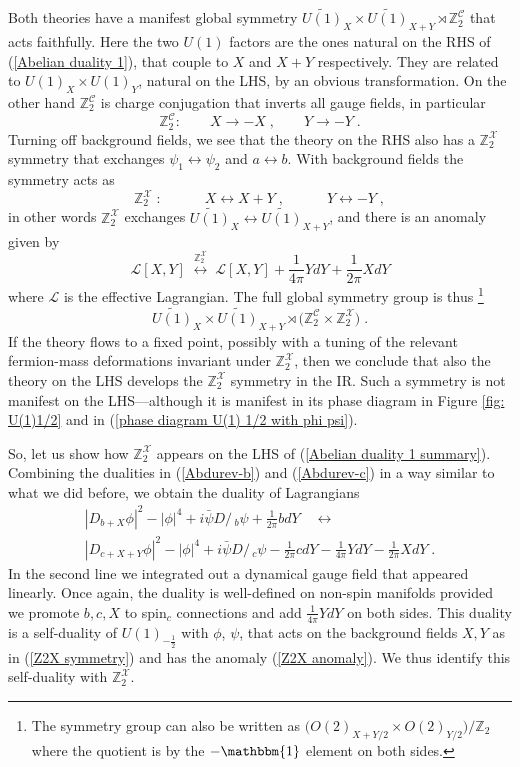 \documentclass[a4paper, 12pt]{article}
\newcommand{\wt}{\widetilde}
\numberwithin{equation}{section}
\newcommand{\Dslash}{D\!\!\!\!\slash\,}
\newcommand{\be}{\begin{equation}} \newcommand{\ee}{\end{equation}}
\newcommand{\cC}{\mathcal{C}}
\newcommand{\cL}{\mathcal{L}}
\newcommand{\cX}{\mathcal{X}}
\newcommand{\bZ}{\mathbb{Z}}
\newcommand{\unit}{\mathbbm{1}}
\begin{document}
Both theories have a manifest global symmetry $\wt{U(1)}_X \times \wt{U(1)}_{X+Y} \rtimes \bZ_2^\cC$ that acts faithfully. Here the two $U(1)$ factors are the ones natural on the RHS of (\ref{Abelian duality 1}), that couple to $X$ and $X+Y$ respectively. They are related to $U(1)_X \times U(1)_Y$, natural on the LHS, by an obvious transformation. On the other hand $\bZ_2^\cC$ is charge conjugation that inverts all gauge fields, in particular
\be
\bZ_2^\cC:\qquad X \to - X \;,\qquad Y \to -Y \;.
\ee
Turning off background fields, we see that the theory on the RHS also has a $\bZ_2^\cX$ symmetry that exchanges $\psi_1 \leftrightarrow\psi_2$ and $a \leftrightarrow b$. With background fields the symmetry acts as
\be
\label{Z2X symmetry}
\bZ_2^\cX\;:\qquad\quad X \leftrightarrow X+Y \;,\qquad\quad Y \leftrightarrow - Y \;,
\ee
in other words $\bZ_2^\cX$ exchanges $\wt{U(1)}_X \leftrightarrow \wt{U(1)}_{X+Y}$, and there is an anomaly given by
\be
\label{Z2X anomaly}
\cL[X,Y] \;\stackrel{\bZ_2^\cX}{\longleftrightarrow}\; \cL[X,Y] + \frac1{4\pi} YdY + \frac1{2\pi} XdY
\ee
where $\cL$ is the effective Lagrangian. The full global symmetry group is thus%
\footnote{The symmetry group can also be written as $\big( O(2)_{X + Y/2} \times O(2)_{Y/2} \big)/\bZ_2$ where the quotient is by the $-\unit$ element on both sides.}
\be
\wt{U(1)}_X \times \wt{U(1)}_{X+Y} \rtimes \big( \bZ_2^\cC \times \bZ_2^\cX \big) \;.
\ee
If the theory flows to a fixed point, possibly with a tuning of the relevant fermion-mass deformations invariant under $\bZ_2^\cX$, then we conclude that also the theory on the LHS develops the $\bZ_2^\cX$ symmetry in the IR. Such a symmetry is not manifest on the LHS---although it is manifest in its phase diagram in Figure \ref{fig: U(1)1/2} and in (\ref{phase diagram U(1) 1/2 with phi psi}).

So, let us show how $\bZ_2^\cX$ appears on the LHS of (\ref{Abelian duality 1 summary}). Combining the dualities in (\ref{Abdurev-b}) and (\ref{Abdurev-c}) in a way similar to what we did before, we obtain the duality of Lagrangians
\begin{multline}
|D_{b+X}\phi|^2 - |\phi|^4 + i \bar\psi \Dslash_b \psi + \frac1{2\pi} bdY \quad\longleftrightarrow \\
|D_{c+X+Y}\phi|^2 - |\phi|^4 + i \bar\psi \Dslash_c \psi - \frac1{2\pi} cdY - \frac1{4\pi} YdY - \frac1{2\pi}XdY \;.
\end{multline}
In the second line we integrated out a dynamical gauge field that appeared linearly. Once again, the duality is well-defined on non-spin manifolds provided we promote $b, c, X$ to spin$_c$ connections and add $\frac1{4\pi} YdY$ on both sides. This duality is a self-duality of $U(1)_{-\frac12}$ with $\phi$, $\psi$, that acts on the background fields $X,Y$ as in (\ref{Z2X symmetry}) and has the anomaly (\ref{Z2X anomaly}). We thus identify this self-duality with $\bZ_2^\cX$.
\end{document}
